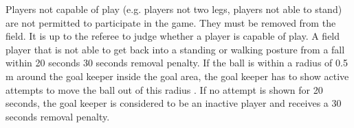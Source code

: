 Players not capable of play (e.g. players not   two legs,
players not able to stand)
are not permitted to participate in the game.
They must be removed from the field.
It is up to the referee to judge whether a player is capable of play.
A field player that is not able to get back into a standing or walking
posture from a fall within 20 seconds 
 30
seconds removal penalty.
If the ball is within a radius of 0.5 m around the goal keeper inside the goal area,
the goal keeper has to show active attempts to move the ball out of this radius .
If no attempt is shown for 20 seconds, the goal keeper is considered to be an
inactive player and receives a 30 seconds removal penalty.


\bigskip

